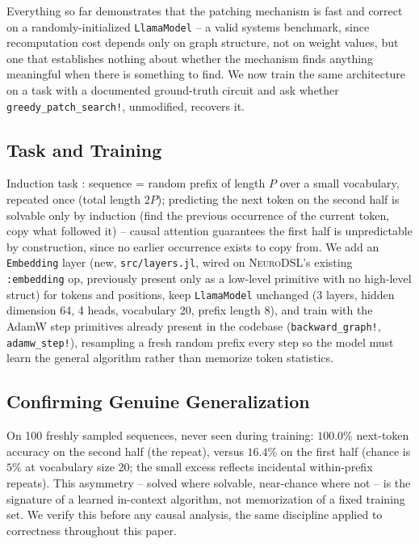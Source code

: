 \documentclass{article}
\begin{document}
Everything so far demonstrates that the patching mechanism is fast and correct on a
randomly-initialized \texttt{LlamaModel} -- a valid systems benchmark, since recomputation cost
depends only on graph structure, not on weight values, but one that establishes nothing about
whether the mechanism finds anything meaningful when there is something to find. We now train the
same architecture on a task with a documented ground-truth circuit and ask whether
\texttt{greedy\_patch\_search!}, unmodified, recovers it.

\subsection{Task and Training}

Induction task \cite{induction}: sequence = random prefix of length $P$ over a small vocabulary,
repeated once (total length $2P$); predicting the next token on the second half is solvable only
by induction (find the previous occurrence of the current token, copy what followed it) -- causal
attention guarantees the first half is unpredictable by construction, since no earlier occurrence
exists to copy from. We add an \texttt{Embedding} layer (new, \texttt{src/layers.jl}, wired on
\textsc{NeuroDSL}'s existing \texttt{:embedding} op, previously present only as a low-level
primitive with no high-level struct) for tokens and positions, keep \texttt{LlamaModel} unchanged
(3 layers, hidden dimension 64, 4 heads, vocabulary 20, prefix length 8), and train with the AdamW
step primitives already present in the codebase (\texttt{backward\_graph!},
\texttt{adamw\_step!}), resampling a fresh random prefix every step so the model must learn the
general algorithm rather than memorize token statistics.

\subsection{Confirming Genuine Generalization}

On 100 freshly sampled sequences, never seen during training: $100.0\%$ next-token accuracy on
the second half (the repeat), versus $16.4\%$ on the first half (chance is $5\%$ at vocabulary
size 20; the small excess reflects incidental within-prefix repeats). This asymmetry -- solved
where solvable, near-chance where not -- is the signature of a learned in-context algorithm, not
memorization of a fixed training set. We verify this before any causal analysis, the same
discipline applied to correctness throughout this paper.
\end{document}
